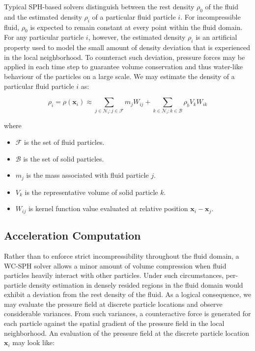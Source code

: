 \documentclass[
	11pt, 
	DIV10,
	ngerman,
	a4paper, 
	oneside, 
	headings=normal, 
	captions=tableheading,
	final, 
	numbers=noenddot
]{scrartcl}
\begin{document}
Typical SPH-based solvers distinguish between the rest density $ \rho_{0} $ of the fluid and the estimated density $ \rho_{i} $ of a particular fluid particle $ i $. For incompressible fluid, $ \rho_{0} $ is expected to remain constant at every point within the fluid domain. For any particular particle $ i $, however, the estimated density $ \rho_{i} $ is an artificial property used to model the small amount of density deviation that is experienced in the local neighborhood. To counteract such deviation, pressure forces may be applied in each time step to guarantee volume conservation and thus water-like behaviour of the particles on a large scale. We may estimate the density of a particular fluid particle $ i $ as:

\begin{equation}
    \label{eq13}
    \rho_{i} = \rho(\mathbf{x}_{i}) \approx \sum_{j \in \mathcal{N}_{i}:j \in \mathcal{F}} m_{j} W_{ij} + \sum_{k \in \mathcal{N}_{i}:k \in \mathcal{B}} \rho_{b} V_{k} W_{ik}
\end{equation}

where

\begin{itemize}
    \item $ \mathcal{F} $ is the set of fluid particles.
    \item $ \mathcal{B} $ is the set of solid particles.
    \item $ m_{j} $ is the mass associated with fluid particle $ j $.
    \item $ V_{k} $ is the representative volume of solid particle $ k $.
    \item $ W_{ij} $ is kernel function value evaluated at relative position $ \mathbf{x}_i - \mathbf{x}_j $.
\end{itemize}

\subsection{Acceleration Computation}

Rather than to enforce strict incompressibility throughout the fluid domain, a WC-SPH solver allows a minor amount of volume compression when fluid particles heavily interact with other particles. Under such circumstances, per-particle density estimation in densely resided regions in the fluid domain would exhibit a deviation from the rest density of the fluid. As a logical consequence, we may evaluate the pressure field at discrete particle locations and observe considerable variances. From such variances, a counteractive force is generated for each particle against the spatial gradient of the pressure field in the local neighborhood. An evaluation of the pressure field at the discrete particle location $ \boldsymbol{x}_{i} $ may look like:
\end{document}
